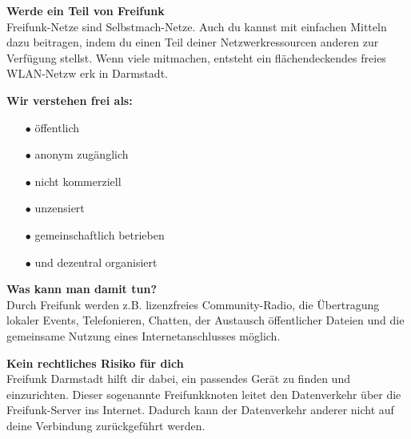 \documentclass[a4paper]{article}
\begin{document}
\begin{Row}
    \begin{Cell}{5}
    \textbf{Werde ein Teil von Freifunk} \\
Freifunk-Netze sind Selbstmach-Netze. Auch du kannst mit einfachen Mitteln dazu
 beitragen, indem du einen Teil deiner Netzwerkressourcen anderen zur Verfügung
 stellst. Wenn viele mitmachen, entsteht ein flächendeckendes freies WLAN-Netzw
erk in Darmstadt.
    \end{Cell}
    \begin{Cell}{4}
    \textbf{Wir verstehen frei als:} \vspace*{-0.18cm}
	\begin{itemize}
	   \item[\textcolor{freifunkpink}{\Large$\bullet$}] öffentlich \vspace*{-0.3cm}
	   \item[\textcolor{freifunkpink}{\Large$\bullet$}] anonym zugänglich \vspace*{-0.3cm}
	   \item[\textcolor{freifunkpink}{\Large$\bullet$}] nicht kommerziell \vspace*{-0.3cm}
	   \item[\textcolor{freifunkpink}{\Large$\bullet$}] unzensiert \vspace*{-0.3cm}
	   \item[\textcolor{freifunkpink}{\Large$\bullet$}] gemeinschaftlich betrieben\vspace*{-0.3cm}
	   \item[\textcolor{freifunkpink}{\Large$\bullet$}] und dezentral organisiert
	\end{itemize}
    \end{Cell}
\end{Row}
\newpage

\thispagestyle{empty}

\begin{Row}[cellsep=0.75cm]
    \begin{Cell}{4}
    \textbf{Was kann man damit tun?} \\
    Durch Freifunk werden z.B. lizenzfreies Community-Radio, die Übertragung lokaler Events, Telefonieren, Chatten, der Austausch öffentlicher Dateien und die gemeinsame Nutzung eines Internetanschlusses möglich.
    \end{Cell}
\begin{Cell}{5}
    \textbf{Kein rechtliches Risiko für dich} \\
Freifunk Darmstadt hilft dir dabei, ein passendes Gerät zu finden und einzurichten. Dieser sogenannte Freifunkknoten leitet den Datenverkehr über die Freifunk-Server ins Internet. Dadurch kann der Datenverkehr anderer nicht auf deine Verbindung zurückgeführt werden.
\end{Cell}
\end{Row}
\end{document}
